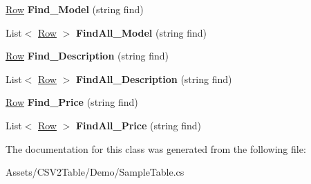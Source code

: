 \begin{DoxyCompactItemize}
\item 
\hyperlink{class_sample_table_1_1_row}{Row} {\bfseries Find\+\_\+\+Model} (string find)\hypertarget{class_sample_table_ad806d16fa751d95723583db709af1776}{}\label{class_sample_table_ad806d16fa751d95723583db709af1776}

\item 
List$<$ \hyperlink{class_sample_table_1_1_row}{Row} $>$ {\bfseries Find\+All\+\_\+\+Model} (string find)\hypertarget{class_sample_table_ab63e114c51338bc726850fb3586e3b78}{}\label{class_sample_table_ab63e114c51338bc726850fb3586e3b78}

\item 
\hyperlink{class_sample_table_1_1_row}{Row} {\bfseries Find\+\_\+\+Description} (string find)\hypertarget{class_sample_table_a3680eaccaa2eb892a85e56405aae5a4f}{}\label{class_sample_table_a3680eaccaa2eb892a85e56405aae5a4f}

\item 
List$<$ \hyperlink{class_sample_table_1_1_row}{Row} $>$ {\bfseries Find\+All\+\_\+\+Description} (string find)\hypertarget{class_sample_table_ad64b1a18b682c296c238680b87d5ed9b}{}\label{class_sample_table_ad64b1a18b682c296c238680b87d5ed9b}

\item 
\hyperlink{class_sample_table_1_1_row}{Row} {\bfseries Find\+\_\+\+Price} (string find)\hypertarget{class_sample_table_a82bd0e5c7a6eda32b9fcaa1de63dd983}{}\label{class_sample_table_a82bd0e5c7a6eda32b9fcaa1de63dd983}

\item 
List$<$ \hyperlink{class_sample_table_1_1_row}{Row} $>$ {\bfseries Find\+All\+\_\+\+Price} (string find)\hypertarget{class_sample_table_a628775517addde82656497510fd76760}{}\label{class_sample_table_a628775517addde82656497510fd76760}

\end{DoxyCompactItemize}


The documentation for this class was generated from the following file\+:\begin{DoxyCompactItemize}
\item 
Assets/\+C\+S\+V2\+Table/\+Demo/Sample\+Table.\+cs\end{DoxyCompactItemize}
